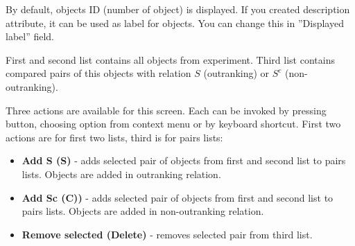 By default, objects ID (number of object) is displayed. If you created description attribute, it can be used as label for objects. You can change this in ''Displayed label'' field. 

First and second list contains all objects from experiment. Third list contains compared pairs of this objects with relation $S$ (outranking) or $S^{c}$ (non-outranking).

Three actions are available for this screen. Each can be invoked by pressing button, choosing option from context menu or by keyboard shortcut. First two actions are for first two lists, third is for pairs lists:
\begin{itemize}
	\item \textbf{Add S (S)} - adds selected pair of objects from first and second list to pairs lists. Objects are added in outranking relation.
	\item \textbf{Add Sc (C))} - adds selected pair of objects from first and second list to pairs lists. Objects are added in non-outranking relation.
	\item \textbf{Remove selected (Delete)} - removes selected pair from third list.
\end{itemize}



\vfill\newpage